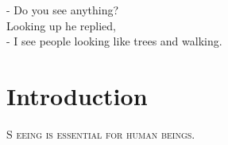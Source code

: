 
\begin{savequote}[65mm]
- Do you see anything? \\
{\normalfont Looking up he replied,} \\
- I see people looking like trees and walking.
\end{savequote}

\chapter{Introduction}
\label{chap:intro}

\lettrine[lines=3]{\textcolor{SchoolColor}{S}}{
eeing is essential for human beings.
}
